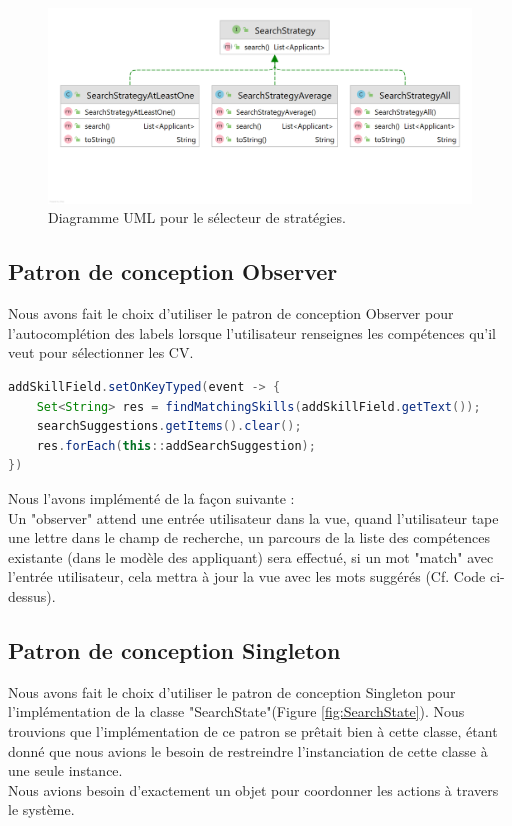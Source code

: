 \documentclass{article}
\begin{document}
\begin{figure}[!tbp]
\centering
\begin{minipage}[b]{1\textwidth}
    \includegraphics[width=\textwidth]{SearchStrategy.png}
    \caption{\label{fig:SearchStrategyUML}Diagramme UML pour le sélecteur de stratégies.}
\end{minipage}
\end{figure}


\subsection{Patron de conception Observer}
Nous avons fait le choix d'utiliser le patron de conception Observer pour l'autocomplétion des labels lorsque l'utilisateur renseignes les compétences qu'il veut pour sélectionner les CV.
\begin{lstlisting}[language=java]
addSkillField.setOnKeyTyped(event -> {
    Set<String> res = findMatchingSkills(addSkillField.getText());
    searchSuggestions.getItems().clear();
    res.forEach(this::addSearchSuggestion);
})
\end{lstlisting}
Nous l'avons implémenté de la façon suivante :\\
Un "observer" attend une entrée utilisateur dans la vue, quand l'utilisateur tape une lettre dans le champ de recherche, un parcours de la liste des compétences existante (dans le modèle des appliquant) sera effectué, si un mot "match" avec l'entrée utilisateur, cela mettra à jour la vue avec les mots suggérés (Cf. Code ci-dessus).

\subsection{Patron de conception Singleton}
Nous avons fait le choix d'utiliser le patron de conception Singleton pour l'implémentation de la classe "SearchState"(Figure \ref{fig:SearchState}).
Nous trouvions que l'implémentation de ce patron se prêtait bien à cette classe, étant donné que nous avions le besoin de restreindre l'instanciation de cette classe à une seule instance.\\
Nous avions besoin d'exactement un objet pour coordonner les actions à travers le système.
\end{document}
